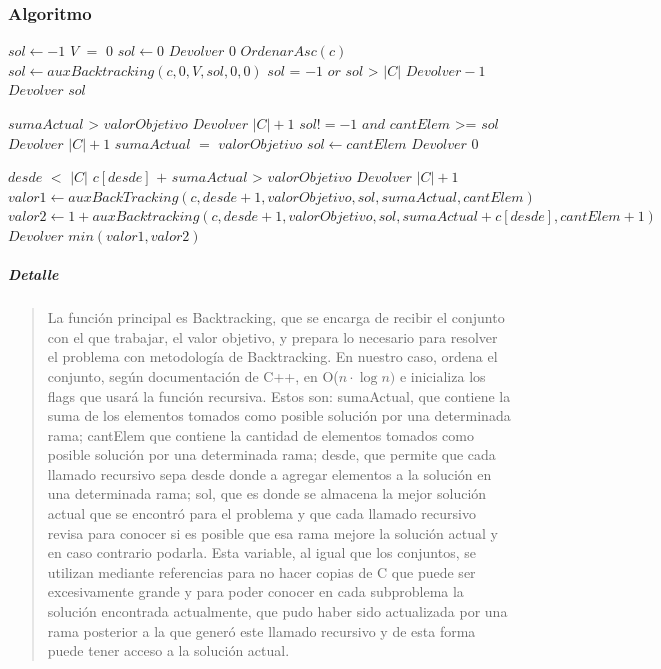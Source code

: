 \documentclass[8pt,a4paper]{article}
\begin{document}
\subsubsection{Algoritmo}



\begin{codebox}
  \li $sol \gets -1$ \li 
  \If $V$ $=$ $0$ \Then \li 
  	$sol \gets 0 $ \li 
  	$Devolver$ $0$
  \End 
  \li $OrdenarAsc(c)$
  \li $sol \gets auxBacktracking(c,0,V,sol,0,0)$
\li \If $sol$ = $-1$ $or$ $sol$ > $|C|$ \Then
\li 	$Devolver -1$\li 
\Else \li 
		$Devolver$ $sol$
	\End
  	\End
\end{codebox}

\begin{codebox}
\li 	\If $sumaActual$ > $valorObjetivo$ \Then 
		\li $Devolver$ $|C|+1$ 
		\End
	\li \If $sol!=-1$ $and$ $cantElem$ >= $sol$ \Then
		\li $Devolver$ $|C|+1$
  		\End
  	\li \If $sumaActual$ $=$ $valorObjetivo$ \Then
  	\li $sol \gets cantElem$
  	\li $Devolver$ $0$ 
  	\End
  	
  	\li \If $desde$ $<$ $|C|$ \Then
  	\li \If $c[desde]$ $+$ $sumaActual$ > $valorObjetivo$ \Then
  	\li $Devolver$ $|C|+1$ \li
  	\Else \li$valor1 \gets auxBackTracking(c,desde+1,valorObjetivo,sol,sumaActual,cantElem)$
  	\li $valor2 \gets 1+auxBacktracking(c,desde+1,valorObjetivo,sol,sumaActual+c[desde],cantElem+1)$
  	\li $Devolver$ $min(valor1,valor2)$
  	\End
\end{codebox}

\subparagraph{Detalle} 

\begin{verse}
La función principal es Backtracking, que se encarga de recibir el conjunto con el que trabajar, el valor objetivo, y prepara lo necesario para resolver el problema con metodología de Backtracking. En nuestro caso, ordena el conjunto, según documentación de C++, en O($ n \cdot \log{n})$ e inicializa los flags que usará la función recursiva. Estos son: sumaActual, que contiene la suma de los elementos tomados como posible solución por una determinada rama; cantElem que contiene la cantidad de elementos tomados como posible solución por una determinada rama; desde, que permite que cada llamado recursivo sepa desde donde a agregar elementos a la solución en una determinada rama; sol, que es donde se almacena la mejor solución actual que se encontró para el problema y que cada llamado recursivo revisa para conocer si es posible que esa rama mejore la solución actual y en caso contrario podarla. Esta variable, al igual que los conjuntos, se utilizan mediante referencias para no hacer copias de C que puede ser excesivamente grande y para poder conocer en cada subproblema la solución encontrada actualmente, que pudo haber sido actualizada por una rama posterior a la que generó este llamado recursivo y de esta forma puede tener acceso a la solución actual.
\end{verse}
\end{document}
